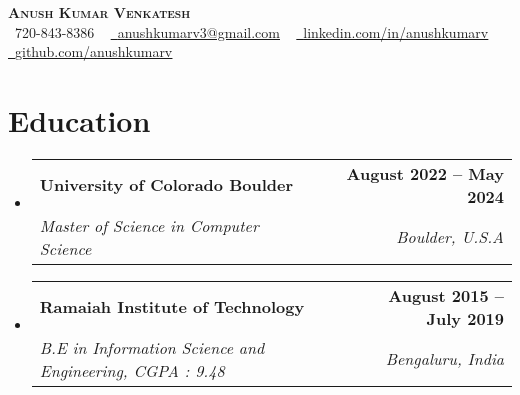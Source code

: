 \documentclass[letterpaper,11pt]{article}
\makeatletter
\newcommand{\resumeSubheading}[4]{
  \vspace{-2pt}\item
    \begin{tabular*}{1.0\textwidth}[t]{l@{\extracolsep{\fill}}r}
      \textbf{#1} & \textbf{\small #2} \\
      \textit{\small#3} & \textit{\small #4} \\
    \end{tabular*}\vspace{-7pt}
}
\newcommand{\resumeSubHeadingListStart}{\begin{itemize}[leftmargin=0.0in, label={}]}
\newcommand{\resumeSubHeadingListEnd}{\end{itemize}}
\makeatother
\begin{document}

\begin{center}
    {\Huge \scshape \textbf{Anush Kumar Venkatesh}} \\ \vspace{1pt}
    \small \raisebox{-0.1\height}\faPhone\ 720-843-8386 ~ \href{mailto:x@gmail.com}{\raisebox{-0.2\height}\faEnvelope\  \underline{anushkumarv3@gmail.com}} ~ 
    \href{https://linkedin.com/in//}{\raisebox{-0.2\height}\faLinkedin\ \underline{linkedin.com/in/anushkumarv}}  ~
    \href{https://github.com/}{\raisebox{-0.2\height}\faGithub\ \underline{github.com/anushkumarv}}
    \vspace{-8pt}
\end{center}

\section{Education}
  \resumeSubHeadingListStart
    \resumeSubheading
      {University of Colorado Boulder}{August 2022 -- May 2024}
      {Master of Science in Computer Science}{Boulder, U.S.A}
    \resumeSubheading
      {Ramaiah Institute of Technology}{August 2015 -- July 2019}
      {B.E in Information Science and Engineering, CGPA : 9.48}{Bengaluru, India}
  \resumeSubHeadingListEnd
\end{document}
